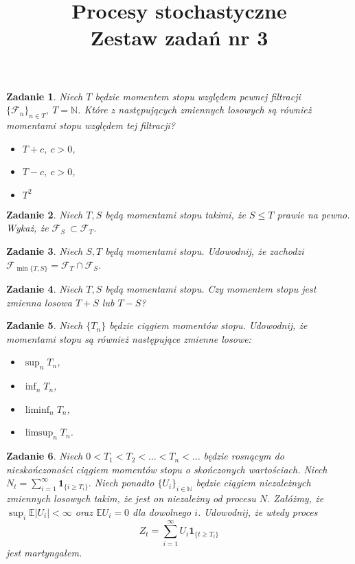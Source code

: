 \documentclass[12pt]{article}
\title{Procesy stochastyczne\\ Zestaw zadań nr 3}
\newtheorem{zd}{Zadanie}
\begin{document}
\maketitle
\begin{zd}
Niech $T$ będzie momentem stopu względem pewnej filtracji $\{\mathcal{F}_n\}_{n\in T},\ T = \mathbb{N}$. Które z następujących zmiennych losowych są również momentami stopu względem tej filtracji?
\begin{itemize}
	\item $T + c, \ c > 0$,
	\item $T - c, \ c >0$,
	\item $T^2$
\end{itemize}
\end{zd}

\begin{zd}
	Niech $T, S$ będą momentami stopu takimi, że $S \leq T$ prawie na pewno. Wykaż, że $\mathcal{F}_{S}\ \subset \mathcal{F}_{T}$. 
\end{zd}
\begin{zd}
	Niech $S, T$ będą momentami stopu. Udowodnij, że zachodzi $\mathcal{F}_{\min\{T,S\}} = \mathcal{F}_{T} \cap \mathcal{F}_{S}$.
\end{zd}
\begin{zd}
		Niech $T, S$ będą momentami stopu. Czy momentem stopu jest zmienna losowa $T + S$ lub $T - S$?
\end{zd}

\begin{zd}
	Niech $\{T_n\}$ będzie ciągiem momentów stopu. Udowodnij, że momentami stopu są również następujące zmienne losowe:
	\begin{itemize}
		\item $\sup_nT_n$,
		\item $\inf_n T_n$,
		\item $\liminf_n T_n$,
		\item $\limsup_n T_n$.
	\end{itemize}
\end{zd}

\begin{zd}
	Niech $0 < T_1 < T_2 < \dots < T_n < \dots $ będzie rosnącym do nieskończoności ciągiem momentów stopu o skończonych wartościach. Niech $N_t = \sum_{i = 1}^{\infty}\pmb{1}_{\{i \geq T_i\}}.$ Niech ponadto $\{U_i\}_{i \in \mathbb{N}}$ będzie ciągiem niezależnych zmiennych losowych takim, że jest on niezależny od procesu $N$. Załóżmy, że $\sup_i\mathbb{E}|U_i|< \infty$ oraz $\mathbb{E}U_i = 0$ dla dowolnego $i$. Udowodnij, że wtedy proces 
	\begin{displaymath}
		Z_t = \sum_{i = 1}^{\infty}U_i\pmb{1}_{\{t \geq T_i\}}
	\end{displaymath}
	jest martyngałem.
\end{zd}
\end{document}
